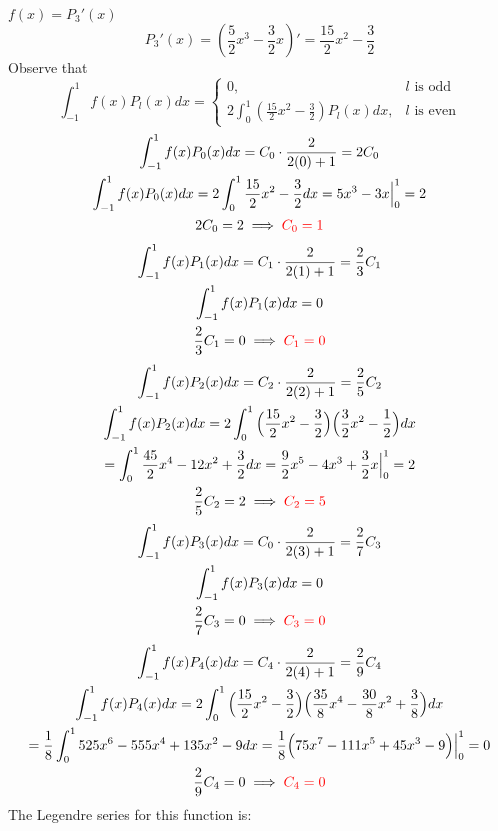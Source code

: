 \item [3.] $f(x)= P_3'(x)$
\[
    P_3'(x) = (\frac{5}{2}x^3 - \frac{3}{2}x)' = \frac{15}{2}x^2 - \frac{3}{2}
\]
Observe that
\[
    \int_{-1}^1f(x)P_l(x)dx =
    \begin{cases}
        0, & l \text{ is odd}\\
        2 \int_{0}^1 (\frac{15}{2}x^2 - \frac{3}{2})P_l(x)dx, & l \text{ is even}
    \end{cases}
\]
\begin{gather*}
    \int_{-1}^{1}f(x)P_0(x)dx =C_0\cdot \frac{2}{2(0)+1} = 2C_0\\
    \int_{-1}^{1}f(x)P_0(x)dx 
    = 2 \int_0^1 \frac{15}{2}x^2 - \frac{3}{2} dx 
    = 5x^3 - 3x\Big|_0^1 
    = 2\\
    2C_0 = 2 \implies \textcolor{red}{C_0 = 1}
\end{gather*}
\begin{gather*}
    \int_{-1}^{1}f(x)P_1(x)dx =C_1\cdot \frac{2}{2(1)+1} = \frac{2}{3}C_1\\
    \int_{-1}^{1}f(x)P_1(x)dx = 0\\
    \frac{2}{3}C_1 = 0 \implies \textcolor{red}{C_1 = 0}
\end{gather*}
\begin{gather*}
    \int_{-1}^{1}f(x)P_2(x)dx =C_2\cdot \frac{2}{2(2)+1} = \frac{2}{5}C_2\\
    \int_{-1}^{1}f(x)P_2(x)dx
    = 2 \int_0^1 \Big(\frac{15}{2}x^2 - \frac{3}{2}\Big)
    \Big(\frac{3}{2}x^2 - \frac{1}{2}\Big)dx \\
    = \int_0^1 \frac{45}{2}x^4-12x^2+\frac{3}{2}dx
    = \frac{9}{2}x^5-4x^3+\frac{3}{2}x\Big|_0^1 
    = 2\\
    \frac{2}{5}C_2 = 2 \implies \textcolor{red}{C_2 = 5}
\end{gather*}
\begin{gather*}
    \int_{-1}^{1}f(x)P_3(x)dx =C_0\cdot \frac{2}{2(3)+1} = \frac{2}{7}C_3\\
    \int_{-1}^{1}f(x)P_3(x)dx 
    = 0\\
    \frac{2}{7}C_3 = 0 \implies \textcolor{red}{C_3 = 0}
\end{gather*}
\begin{gather*}
    \int_{-1}^{1}f(x)P_4(x)dx =C_4\cdot \frac{2}{2(4)+1} = \frac{2}{9}C_4\\
    \int_{-1}^{1}f(x)P_4(x)dx
    = 2 \int_0^1 \Big(\frac{15}{2}x^2 - \frac{3}{2}\Big)
    \Big(\frac{35}{8}x^4 - \frac{30}{8}x^2 + \frac{3}{8}\Big)dx \\
    = \frac{1}{8}\int_0^1 525x^6-555x^4+135x^2-9 dx 
    = \frac{1}{8}\Big(75x^7-111x^5+45x^3-9\Big)\Big|_0^1 
    = 0\\
    \frac{2}{9}C_4 = 0 \implies \textcolor{red}{C_4 = 0}
\end{gather*}
The Legendre series for this function is:
\answer{
\[
    P_0(x)+
    5P_2(x)+
    ...
\]
}